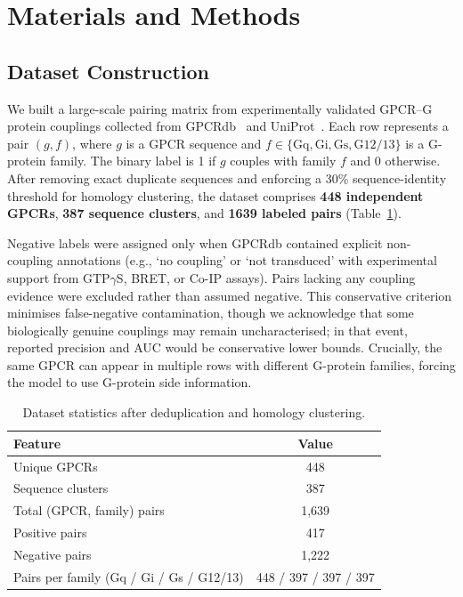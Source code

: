 \documentclass[11pt,a4paper]{article}
\begin{document}
\section{Materials and Methods}

\subsection{Dataset Construction}

We built a large-scale pairing matrix from experimentally validated GPCR--G protein couplings collected from GPCRdb~\cite{kooistra2021gpcrdb} and UniProt~\cite{uniprot2023uniprot}. Each row represents a pair $(g, f)$, where $g$ is a GPCR sequence and $f \in \{\text{Gq}, \text{Gi}, \text{Gs}, \text{G12/13}\}$ is a G-protein family. The binary label is 1 if $g$ couples with family $f$ and 0 otherwise. After removing exact duplicate sequences and enforcing a 30\% sequence-identity threshold for homology clustering, the dataset comprises \textbf{448 independent GPCRs}, \textbf{387 sequence clusters}, and \textbf{\num{1639} labeled pairs} (Table~\ref{tab:dataset}).

Negative labels were assigned only when GPCRdb contained explicit non-coupling annotations (e.g., `no coupling' or `not transduced' with experimental support from GTP$\gamma$S, BRET, or Co-IP assays). Pairs lacking any coupling evidence were excluded rather than assumed negative. This conservative criterion minimises false-negative contamination, though we acknowledge that some biologically genuine couplings may remain uncharacterised; in that event, reported precision and AUC would be conservative lower bounds. Crucially, the same GPCR can appear in multiple rows with different G-protein families, forcing the model to use G-protein side information.

\begin{table}[H]
\centering
\caption{Dataset statistics after deduplication and homology clustering.}
\label{tab:dataset}
\begin{tabular}{lc}
\toprule
\textbf{Feature} & \textbf{Value} \\
\midrule
Unique GPCRs & 448 \\
Sequence clusters & 387 \\
Total (GPCR, family) pairs & 1,639 \\
Positive pairs & 417 \\
Negative pairs & 1,222 \\
Pairs per family (Gq / Gi / Gs / G12/13) & 448 / 397 / 397 / 397 \\
\bottomrule
\end{tabular}
\end{table}
\end{document}
